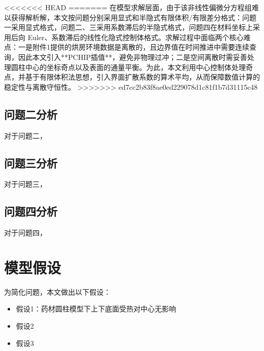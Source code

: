 \documentclass[withoutpreface,bwprint]{cumcm_thesis}
\begin{document}
<<<<<<< HEAD
=======
在模型求解层面，由于该非线性偏微分方程组难以获得解析解，本文按问题分别采用显式和半隐式有限体积/有限差分格式：问题一采用显式格式，问题二、三采用系数滞后的半隐式格式，问题四在材料坐标上采用后向 Euler、系数滞后的线性化隐式控制体格式。求解过程中面临两个核心难点：一是附件1提供的烘房环境数据是离散的，且边界值在时间推进中需要连续查询，因此本文引入**PCHIP插值**，避免非物理过冲；二是空间离散时需妥善处理圆柱中心的坐标奇点以及表面的通量平衡。为此，本文利用中心控制体处理奇点，并基于有限体积法思想，引入界面扩散系数的算术平均，从而保障数值计算的稳定性与离散守恒性。
>>>>>>> ed7cc2b83f8ae0ed229078d1c81f1b7d31115c48


\subsection{问题二分析}	
对于问题二，

\subsection{问题三分析}
对于问题三，

\subsection{问题四分析}
对于问题四，


\section{模型假设}

为简化问题，本文做出以下假设：

\begin{itemize}[itemindent=2em] %
\item 假设1：药材圆柱模型下上下底面受热对中心无影响
\item 假设2
\item 假设3
\end{itemize}

\end{document}
